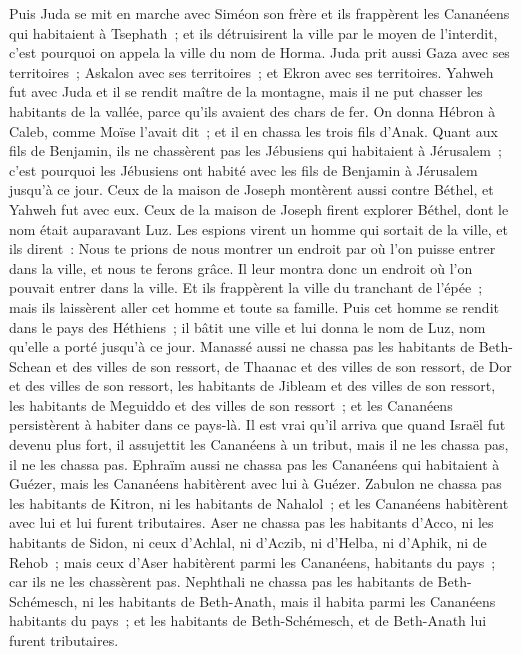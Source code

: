 \begin{multicols}{2}
Puis Juda se mit en marche avec Siméon son frère et ils frappèrent les Cananéens qui habitaient à Tsephath~; et ils détruisirent la ville par le moyen de l'interdit, c'est pourquoi on appela la ville du nom de Horma.
Juda prit aussi Gaza avec ses territoires~; Askalon avec ses territoires~; et Ekron avec ses territoires.
Yahweh fut avec Juda et il se rendit maître de la montagne, mais il ne put chasser les habitants de la vallée, parce qu'ils avaient des chars de fer.
On donna Hébron à Caleb, comme Moïse l'avait dit~; et il en chassa les trois fils d'Anak.
Quant aux fils de Benjamin, ils ne chassèrent pas les Jébusiens qui habitaient à Jérusalem~; c'est pourquoi les Jébusiens ont habité avec les fils de Benjamin à Jérusalem jusqu'à ce jour.
Ceux de la maison de Joseph montèrent aussi contre Béthel, et Yahweh fut avec eux.
Ceux de la maison de Joseph firent explorer Béthel, dont le nom était auparavant Luz.
Les espions virent un homme qui sortait de la ville, et ils dirent~: Nous te prions de nous montrer un endroit par où l'on puisse entrer dans la ville, et nous te ferons grâce.
Il leur montra donc un endroit où l'on pouvait entrer dans la ville. Et ils frappèrent la ville du tranchant de l'épée~; mais ils laissèrent aller cet homme et toute sa famille.
Puis cet homme se rendit dans le pays des Héthiens~; il bâtit une ville et lui donna le nom de Luz, nom qu'elle a porté jusqu'à ce jour.
Manassé aussi ne chassa pas les habitants de Beth-Schean et des villes de son ressort, de Thaanac et des villes de son ressort, de Dor et des villes de son ressort, les habitants de Jibleam et des villes de son ressort, les habitants de Meguiddo et des villes de son ressort~; et les Cananéens persistèrent à habiter dans ce pays-là.
Il est vrai qu'il arriva que quand Israël fut devenu plus fort, il assujettit les Cananéens à un tribut, mais il ne les chassa pas, il ne les chassa pas.
Ephraïm aussi ne chassa pas les Cananéens qui habitaient à Guézer, mais les Cananéens habitèrent avec lui à Guézer.
Zabulon ne chassa pas les habitants de Kitron, ni les habitants de Nahalol~; et les Cananéens habitèrent avec lui et lui furent tributaires.
Aser ne chassa pas les habitants d'Acco, ni les habitants de Sidon, ni ceux d'Achlal, ni d'Aczib, ni d'Helba, ni d'Aphik, ni de Rehob~;
mais ceux d'Aser habitèrent parmi les Cananéens, habitants du pays~; car ils ne les chassèrent pas.
Nephthali ne chassa pas les habitants de Beth-Schémesch, ni les habitants de Beth-Anath, mais il habita parmi les Cananéens habitants du pays~; et les habitants de Beth-Schémesch, et de Beth-Anath lui furent tributaires.

\end{multicols}
